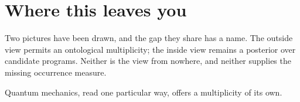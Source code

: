 \section*{Where this leaves you}

Two pictures have been drawn, and the gap they share has a name. The outside view permits an ontological multiplicity; the inside view remains a posterior over candidate programs. Neither is the view from nowhere, and neither supplies the missing occurrence measure.

Quantum mechanics, read one particular way, offers a multiplicity of its own.
